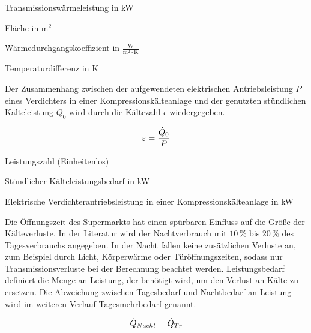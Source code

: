 \begin{description}[\dth]

	\item[$\ptrans$] Transmissionswärmeleistung in kW
	\item[$A$] Fläche in $\mathrm{m^2}$
	\item[$k$] Wärmedurchgangskoeffizient in $\mathrm{\frac{W}{m^2 \cdot
	K}}$
	\item[$\Delta\: t$] Temperaturdifferenz in K

\end{description}
\vspace{0.5cm}

Der Zusammenhang zwischen der aufgewendeten elektrischen Antriebsleistung $P$
eines Verdichters in einer Kompressionskälteanlage und der genutzten
st\"undlichen Kälteleistung ${\dot{Q}}_0$ wird durch die Kältezahl $\epsilon$
wiedergegeben.

\begin{equation}
	\epsilon = \frac{\pkalt}{P}
\label{epsilon}
\end{equation}

\begin{description}[\dth]

	\item[$\epsilon$] Leistungszahl (Einheitenlos)
	\item[$\pkalt$] St\"undlicher Kälteleistungsbedarf in kW
	\item[$P$] Elektrische Verdichterantriebsleistung in einer
		Kompressionskälteanlage in kW

\end{description}
\vspace{0.5cm}

Die Öffnungszeit des Supermarkts hat einen spürbaren Einfluss auf die Größe der
K\"alteverluste. In der Literatur wird der Nachtverbrauch mit $10\,\%$ bis $20\,\%$
des Tagesverbrauchs angegeben\cite{kauffeld}.  In der Nacht fallen keine
zusätzlichen Verluste an, zum Beispiel durch Licht, Körperwärme oder
Türöffnungszeiten, sodass nur Transmissionsverluste bei der Berechnung beachtet
werden. Leistungsbedarf definiert die Menge an Leistung, der ben\"otigt wird, um
den Verlust an K\"alte zu ersetzen. Die Abweichung zwischen Tagesbedarf und
Nachtbedarf an Leistung wird im weiteren Verlauf Tagesmehrbedarf genannt.

\begin{equation}
	\dot{Q}_{Nacht}=\ptrans
\label{pnacht}
\end{equation}

